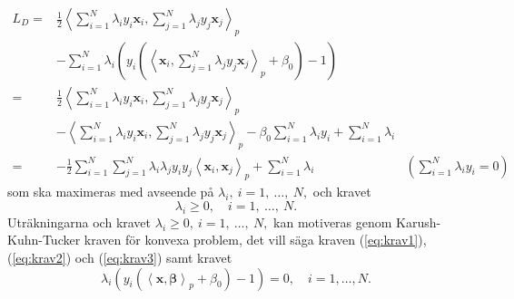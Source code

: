 \documentclass[a4paper, 12pt]{report}
\theoremstyle{definition}
\theoremstyle{remark}
\newcommand{\bfbeta}{{\boldsymbol{\beta}}}
\newcommand{\bfx}{\mathbf{x}}
\newcommand{\llangle}{\left\langle}
\newcommand{\rrangle}{\right\rangle}
\newcommand{\inner}[2]{\llangle #1, #2 \rrangle}
\begin{document}
\begin{equation*}
\begin{aligned}
	L_D=&\frac{1}{2}\inner{\sum_{i=1}^{N}\lambda_i y_i \mathbf{x}_i}{ \sum_{j=1}^{N}\lambda_j y_j \mathbf{x}_j}_p&\\
	&- \sum_{i=1}^{N}\lambda_i \left( y_i \left(\inner{\mathbf{x}_i}{ \sum_{j=1}^{N}\lambda_j y_j \bfx_j}_p + \beta_0 \right) -1\right)&\\
	=& \frac{1}{2} \inner{\sum_{i=1}^{N} \lambda_i y_i \bfx_i}{\sum_{j=1}^{N} \lambda_j y_j \bfx_j}_p &\\
	&- \inner{\sum_{i=1}^{N}\lambda_i y_i \mathbf{x}_i}{\sum_{j=1}^{N} \lambda_j y_j \mathbf{x}_j}_p - \beta_0 \sum_{i=1}^{N} \lambda_i y_i  + \sum_{i=1}^{N} \lambda_i&\\
	=& -\frac{1}{2} \sum_{i=1}^{N} \sum_{j=1}^{N} \lambda_i \lambda_j y_i y_j \inner{\mathbf{x}_i}{\mathbf{x}_j}_p + \sum_{i=1}^{N} \lambda_i &\textstyle{\left(\sum\limits_{i=1}^{N}\lambda_iy_i = 0\right)}
\end{aligned}
\end{equation*}
som ska maximeras med avseende på $\lambda_i,~i=1,~\dots,~N,$ och kravet \begin{equation}\label{eq:krav3}
	\lambda_i\geq 0,\quad i=1,~\dots,~N.
\end{equation} Uträkningarna och kravet $\lambda_i\geq 0,~i=1,~\dots,~N,$ kan motiveras genom Karush-Kuhn-Tucker kraven \cite{Boyd} för konvexa problem, det vill säga kraven (\ref{eq:krav1}), (\ref{eq:krav2}) och (\ref{eq:krav3}) samt kravet %
\begin{equation}\label{eq:krav4}
	\lambda_i\left( y_i\left( \inner{\bfx}{\bfbeta}_p + \beta_0 \right) -1 \right) = 0,\quad i=1,\dots, N.
\end{equation}
\end{document}
